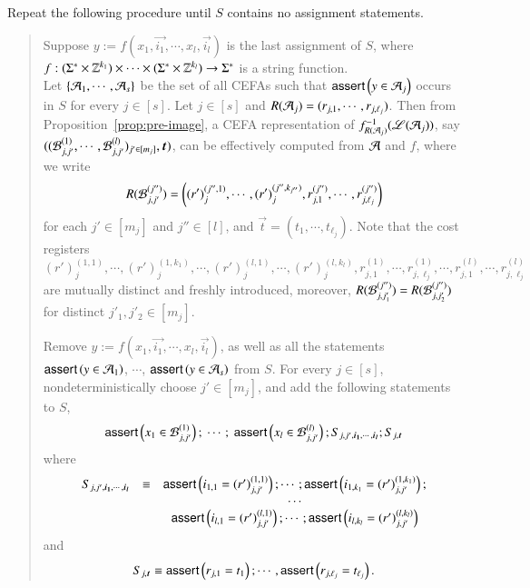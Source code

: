 Repeat the following procedure until $S$ contains no assignment statements.
%
\begin{quote}
Suppose $y := f(x_1, \vec{i_1}, \cdots, x_l, \vec{i_l})$ is the last assignment of $S$, where $f: (\Sigma^* \times \mathbb{Z}^{k_1}) \times \cdots \times (\Sigma^* \times \mathbb{Z}^{k_l}) \rightarrow \Sigma^*$ is a string function. 
\\
Let $\{\mathcal{A}_1, \cdots, \mathcal{A}_s\}$ be the set of all CEFAs such that $\textsf{assert}\left(y \in \mathcal{A}_j\right)$ occurs in $S$ for every $j \in [s]$. 
Let $j \in [s]$ and $R(\mathcal{A}_j)=(r_{j,1}, \cdots, r_{j, \ell_j})$. Then from Proposition~\ref{prop:pre-image}, 
a CEFA representation of $f^{-1}_{R(\mathcal{A}_j)}(\mathscr{L}(\mathcal{A}_j))$, say $((\cB^{(1)}_{j, j'}, \cdots, \cB^{(l)}_{j, j'})_{j' \in [m_j]}, \vec{t})$, can be effectively computed from $\mathcal{A}$ and $f$, where we write
\[
R(\mathcal{B}^{(j'')}_{j, j'})=\left((r')^{(j'',1)}_{j}, \cdots, (r')_{j}^{(j'',k_{j''})}, r^{(j'')}_{j, 1}, \cdots,r^{(j'')}_{j, \ell_j} \right)
\]
for each $j' \in [m_j]$ and $j'' \in [l]$, and $\vec{t}=(t_1,\cdots, t_{\ell_j})$. Note that the cost registers $(r')^{(1,1)}_{j}, \cdots, (r')_{j}^{(1,k_1)}, \cdots, (r')^{(l,1)}_{j}, \cdots, (r')_{j}^{(l,k_l)}, r^{(1)}_{j, 1}, \cdots,r^{(1)}_{j, \ell_j}, \cdots, r^{(l)}_{j, 1}, \cdots,r^{(l)}_{j, \ell_j}$ are mutually distinct and freshly introduced, moreover, $R(\mathcal{B}^{(j'')}_{j, j'_1})=R(\mathcal{B}^{(j'')}_{j, j'_2})$ for distinct $j'_1,j'_2 \in [m_j]$.
%

Remove $y := f(x_1, \vec{i_1}, \cdots, x_l, \vec{i_l})$, as well as all the statements $\textsf{assert}\left(y \in \mathcal{A}_1\right)$, $\cdots$, $\textsf{assert}\left(y \in \mathcal{A}_s\right)$ from $S$. For every $j \in [s]$, nondeterministically choose $j' \in [m_j]$, and add the following statements to $S$, 
%
\[
\begin{array}{l}
\ASSERT{x_1 \in \cB^{(1)}_{j, j'}};\ \cdots;\ \ASSERT{x_l \in \cB^{(l)}_{j, j'}}; S_{j, j', \vec{i_1}, \cdots, \vec{i_l}}; S_{j, \vec{t}}\\
\end{array}
\]
where 
\[
\begin{array}{l c c}
S_{j, j', \vec{i_1}, \cdots, \vec{i_l}} & \equiv & \ASSERT{i_{1,1} = (r')^{(1,1)}_{j, j'}}; \cdots; \ASSERT{i_{1,k_1} = (r')^{(1,k_1)}_{j, j'}};\\
& & \cdots\\
 & & \ASSERT{i_{l,1} = (r')^{(l,1)}_{j, j'}}; \cdots; \ASSERT{i_{l,k_l} = (r')^{(l,k_l)}_{j, j'}}
\end{array}
\]
and
\[
\begin{array}{l}
S_{j, \vec{t}} \equiv \ASSERT{r_{j, 1} = t_1}; \cdots, \ASSERT{r_{j, \ell_j} = t_{\ell_j}}.
\end{array}
\]
%
\end{quote}

